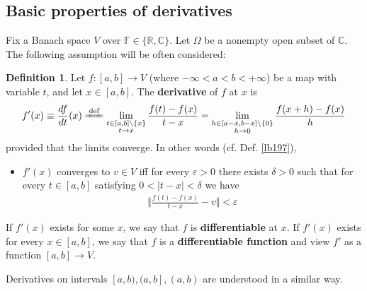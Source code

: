 \documentclass[12pt,b5paper,notitlepage]{article}
\theoremstyle{definition}
\newtheorem{df}{Definition}[section]
\theoremstyle{plain}
\newcommand{\Cbb}{\mathbb C}
\newcommand{\Rbb}{\mathbb R}
\newcommand{\Fbb}{\mathbb F}
\newcommand{\eps}{\varepsilon}
\numberwithin{equation}{section}
\begin{document}
\subsection{Basic properties of derivatives}


Fix a Banach space $V$ over $\Fbb\in\{\Rbb,\Cbb\}$. Let $\Omega$ be a nonempty open subset of $\Cbb$. The following assumption will be often considered:




\begin{df}
Let $f:[a,b]\rightarrow V$ (where  $-\infty<a<b<+\infty$)  be a map with variable $t$, and let $x\in[a,b]$. The \textbf{derivative}  of $f$ at $x$ is
\begin{align*}
f'(x)\equiv \frac{df}{dt}(x)\xlongequal{\mathrm{def}}\lim_{
\begin{subarray}{c}
t\in[a,b]\setminus\{x\}\\
t\rightarrow x
\end{subarray}
}
\frac{f(t)-f(x)}{t-x}
=\lim_{
\begin{subarray}{c}
h\in [a-x,b-x]\setminus\{0\}\\
h\rightarrow 0
\end{subarray}
}
\frac{f(x+h)-f(x)}h
\end{align*}
provided that the limits converge. In other words (cf. Def. \ref{lb197}),
\begin{itemize}
\item $f'(x)$ converges to $v\in V$ iff for every $\eps>0$ there exists $\delta>0$ such that for every $t\in[a,b]$ satisfying $0<|t-x|<\delta$ we have
\begin{align*}
\Big\Vert \frac{f(t)-f(x)}{t-x}-v  \Big\Vert<\eps
\end{align*}
\end{itemize}


If $f'(x)$ exists for some $x$, we say that $f$ is \textbf{differentiable}  at $x$. If $f'(x)$ exists for  every $x\in [a,b]$, we say that $f$ is a \textbf{differentiable function} and view $f'$ as a function $[a,b]\rightarrow V$. 

Derivatives on intervals $[a,b),(a,b],(a,b)$ are understood in a similar way. \hfill\qedsymbol
\end{df}
\end{document}
